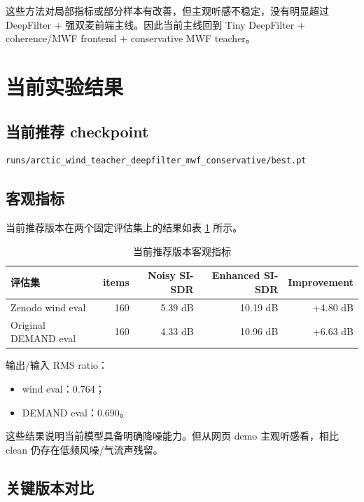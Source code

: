 \documentclass[UTF8,12pt,a4paper]{ctexart}
\begin{document}
这些方法对局部指标或部分样本有改善，但主观听感不稳定，没有明显超过 DeepFilter + 强双麦前端主线。因此当前主线回到 Tiny DeepFilter + coherence/MWF frontend + conservative MWF teacher。

\section{当前实验结果}

\subsection{当前推荐 checkpoint}

\begin{lstlisting}
runs/arctic_wind_teacher_deepfilter_mwf_conservative/best.pt
\end{lstlisting}

\subsection{客观指标}

当前推荐版本在两个固定评估集上的结果如表 \ref{tab:metrics} 所示。

\begin{table}[H]
\centering
\caption{当前推荐版本客观指标}
\label{tab:metrics}
\begin{tabular}{lrrrr}
\toprule
\textbf{评估集} & \textbf{items} & \textbf{Noisy SI-SDR} & \textbf{Enhanced SI-SDR} & \textbf{Improvement} \\
\midrule
Zenodo wind eval & 160 & 5.39 dB & 10.19 dB & +4.80 dB \\
Original DEMAND eval & 160 & 4.33 dB & 10.96 dB & +6.63 dB \\
\bottomrule
\end{tabular}
\end{table}

输出/输入 RMS ratio：

\begin{itemize}
  \item wind eval：0.764；
  \item DEMAND eval：0.690。
\end{itemize}

这些结果说明当前模型具备明确降噪能力。但从网页 demo 主观听感看，相比 clean 仍存在低频风噪/气流声残留。

\subsection{关键版本对比}
\end{document}
